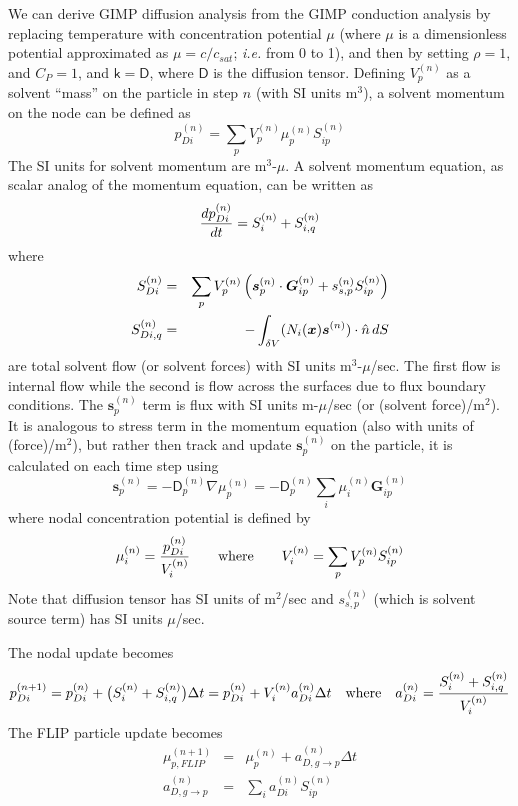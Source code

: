 \documentclass[11pt]{article}
\renewcommand{\vec}[1]{\boldsymbol{#1}}
\newcommand{\tens}[1]{\boldsymbol{\mathsf{#1}}}
\begin{document}
We can derive GIMP diffusion analysis from the GIMP conduction analysis by replacing temperature with concentration potential $\mu$ (where $\mu$ is a dimensionless potential approximated as $\mu=c/c_{sat}$; {\em i.e.} from 0 to 1), and then by setting $\rho=1$, and $C_P=1$, and $\tens k = \tens D$, where $\tens D$ is the diffusion tensor. Defining $V_{p}^{(n)}$ as a solvent ``mass'' on the particle in step $n$ (with SI units m$^3$), a solvent momentum on the node can be defined as
\begin{equation}
      p_{Di}^{(n)} = \sum_p  V_{p}^{(n)} \mu_p^{(n)} S^{(n)}_{ip} 
\end{equation}
The SI units for solvent momentum are m$^3$-$\mu$. A solvent momentum equation, as scalar analog of the momentum equation, can be written as
\begin{equation}
     {d p_{Di}^{(n)}\over dt} = S_{i}^{(n)} + S_{i,q}^{(n)}
\end{equation}
where
\begin{eqnarray}
     S_{Di}^{(n)} & = & \sum_p V_p^{(n)}  \left(\vec s_p^{(n)}\cdot \vec G^{(n)}_{ip}  + s_{s,p}^{(n)} S^{(n)}_{ip} \right) \\
     S_{Di,q}^{(n)} & = & -  \int_{\delta V} (N_i(\vec x)\vec s^{(n)})\cdot \hat n \thinspace dS 
\end{eqnarray}
are total solvent flow (or solvent forces) with SI units m$^3$-$\mu$/sec. The first flow is internal flow while the second is flow across the surfaces due to flux boundary conditions. The $\vec s_p^{(n)}$ term is flux with SI units m-$\mu$/sec (or (solvent force)/m$^2$). It is analogous to stress term in the momentum equation (also with units of (force)/m$^2$), but rather then track and update $\vec s_p^{(n)}$ on the particle, it is calculated on each time step using
\begin{equation}
    \vec s_p^{(n)} = - \tens D_p^{(n)} \nabla \mu_p^{(n)} = - \tens D_p^{(n)}\sum_i \tens  \mu_i^{(n)} \vec G^{(n)}_{ip}
\end{equation}
where nodal concentration potential is defined by
\begin{equation}
       \mu_i^{(n)} = {p_{Di}^{(n)} \over V_{i}^{(n)}} \qquad {\rm where } \qquad V_{i}^{(n)} = \sum_p  V_{p}^{(n)} S^{(n)}_{ip}  
\end{equation}
Note that diffusion tensor has SI units of m$^2$/sec and $s_{s,p}^{(n)}$ (which is solvent source term) has SI units $\mu$/sec.

The nodal update becomes
\begin{equation}
     p_{Di}^{(n+1)} = p_{Di}^{(n)} +  \bigl(S_{i}^{(n)} + S_{i,q}^{(n)}\bigr)\Delta t = p_{Di}^{(n)} +  V_{i}^{(n)} a_{Di}^{(n)}\Delta t
     \quad{\rm where}\quad
     a_{Di}^{(n)} =  { S_{i}^{(n)} + S_{i,q}^{(n)}  \over V_{i}^{(n)}}
\end{equation}
The FLIP particle update becomes
\begin{eqnarray}
     \mu_{p,FLIP}^{(n+1)}  & = & \mu_p^{(n)} + a_{D,g\to p}^{(n)}\Delta t   \\
      a_{D,g\to p}^{(n)} & = & \sum_i a_{Di}^{(n)} S_{ip}^{(n)}    \\
\end{eqnarray}
\end{document}
